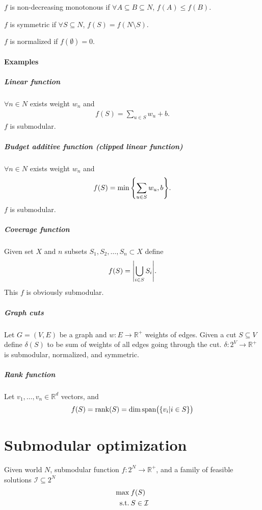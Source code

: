 \begin{definition}
	$f$ is non-decreasing monotonous if $\forall A\subseteq B \subseteq N$, $f(A) \leqslant f(B)$.
\end{definition}

\begin{definition}
	$f$ is symmetric if $\forall S \subseteq N$, $f(S) = f(N\setminus S)$.
\end{definition}
\begin{definition}
$f$ is normalized if $f(\emptyset) = 0$.
\end{definition}

\paragraph{Examples}
\subparagraph{Linear function}
$\forall n\in N$ exists weight $w_n$ and 
\begin{align}
f(S) = \sum_{u \in S} w_u + b.
\end{align} 
$f$ is submodular.
\subparagraph{Budget additive function (clipped linear function)}
$\forall n\in N$ exists weight $w_n$ and 
\begin{align}
f(S) = \min \qty{ \sum_{u \in S} w_u,  b }.
\end{align} 
$f$ is submodular.

\subparagraph{Coverage function}
Given set $X$ and $n$ subsets $S_1, S_2, \dots, S_n \subset X$ define
\begin{align}
f(S) = \abs{\bigcup_{i \in S} S_i}.
\end{align}
This $f$ is obviously submodular.

\subparagraph{Graph cuts}
Let $G=(V,E)$ be a graph and $w: E\to \mathbb{R}^+$ weights of edges. Given a cut $S\subseteq V$ define $\delta(S)$ to be sum of weights of all edges going through the cut. $\delta : 2^V \to \mathbb{R}^+$ is submodular, normalized, and symmetric.


\subparagraph{Rank function}
Let $v_1, \dots, v_n \in \mathbb{R}^d$ vectors, and 
\begin{align}
f(S) = \rank (S) = \dim \text{span} \qty\big( \qty{ v_i | i \in S} )
\end{align}


\section{Submodular optimization}
Given world $N$, submodular function $f: 2^N \to \mathbb{R}^+$, and a family of feasible solutions $\mathcal{I} \subseteq 2^N$
\begin{align}
\max \:& f(S)\\
\text{s.t.} \: & S\in \mathcal{I}
\end{align}

